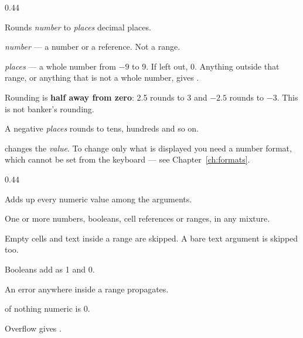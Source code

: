 \begin{ccexamples}{0.44\linewidth}
\end{ccexamples}


Rounds \emph{number} to \emph{places} decimal places.

\begin{ccsteps}
\item \emph{number} --- a number or a reference. Not a range.
\item \emph{places} --- a whole number from $-9$ to 9. If left out, 0. Anything
outside that range, or anything that is not a whole number, gives
.
\end{ccsteps}

\begin{ccsteps}
\item Rounding is \textbf{half away from zero}: 2.5 rounds to 3 and $-2.5$
rounds to $-3$. This is not banker's rounding.
\item A negative \emph{places} rounds to tens, hundreds and so on.
\item {} changes the \emph{value}. To change only what is displayed you
need a number format, which cannot be set from the keyboard --- see Chapter~\ref{ch:formats}.
\end{ccsteps}

\begin{ccexamples}{0.44\linewidth}
\end{ccexamples}


Adds up every numeric value among the arguments.

\begin{ccsteps}
\item One or more numbers, booleans, cell references or ranges, in any mixture.
\end{ccsteps}

\begin{ccsteps}
\item Empty cells and text inside a range are skipped. A bare text argument is
skipped too.
\item Booleans add as 1 and 0.
\item An error anywhere inside a range propagates.
\item {} of nothing numeric is 0.
\item Overflow gives .
\end{ccsteps}

